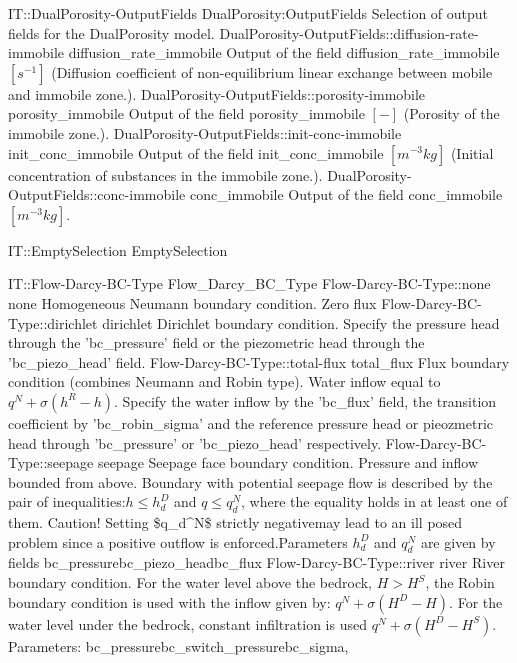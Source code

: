 \begin{SelectionType}
	{IT::DualPorosity-OutputFields}
	{DualPorosity:OutputFields}
	{{{Selection of output fields for the DualPorosity model.}}}
		\SelectionItem
			{DualPorosity-OutputFields::diffusion-rate-immobile}
			{diffusion{\_}rate{\_}immobile}
			{{{Output of the field diffusion{\_}rate{\_}immobile }{$[s^{-1}]$}{ (Diffusion coefficient of non-equilibrium linear exchange between mobile and immobile zone.).}}}
		\SelectionItem
			{DualPorosity-OutputFields::porosity-immobile}
			{porosity{\_}immobile}
			{{{Output of the field porosity{\_}immobile }{$[-]$}{ (Porosity of the immobile zone.).}}}
		\SelectionItem
			{DualPorosity-OutputFields::init-conc-immobile}
			{init{\_}conc{\_}immobile}
			{{{Output of the field init{\_}conc{\_}immobile }{$[m^{-3}kg]$}{ (Initial concentration of substances in the immobile zone.).}}}
		\SelectionItem
			{DualPorosity-OutputFields::conc-immobile}
			{conc{\_}immobile}
			{{{Output of the field conc{\_}immobile }{$[m^{-3}kg]$}{.}}}
\end{SelectionType}
\begin{SelectionType}
	{IT::EmptySelection}
	{EmptySelection}
	{}
\end{SelectionType}
\begin{SelectionType}
	{IT::Flow-Darcy-BC-Type}
	{Flow{\_}Darcy{\_}BC{\_}Type}
	{}
		\SelectionItem
			{Flow-Darcy-BC-Type::none}
			{none}
			{{{Homogeneous Neumann boundary condition. Zero flux}}}
		\SelectionItem
			{Flow-Darcy-BC-Type::dirichlet}
			{dirichlet}
			{{{Dirichlet boundary condition. Specify the pressure head through the 'bc{\_}pressure' field or the piezometric head through the 'bc{\_}piezo{\_}head' field.}}}
		\SelectionItem
			{Flow-Darcy-BC-Type::total-flux}
			{total{\_}flux}
			{{{Flux boundary condition (combines Neumann and Robin type). Water inflow equal to }{$q^N + \sigma (h^R - h)$}{. Specify the water inflow by the 'bc{\_}flux' field, the transition coefficient by 'bc{\_}robin{\_}sigma' and the reference pressure head or pieozmetric head through 'bc{\_}pressure' or 'bc{\_}piezo{\_}head' respectively.}}}
		\SelectionItem
			{Flow-Darcy-BC-Type::seepage}
			{seepage}
			{{{Seepage face boundary condition. Pressure and inflow bounded from above. Boundary with potential seepage flow is described by the pair of inequalities:}{$h \le h_d^D$}{ and }{$ q \le q_d^N$}{, where the equality holds in at least one of them. Caution! Setting {\$}q{\_}d{\^{}}N{\$} strictly negativemay lead to an ill posed problem since a positive outflow is enforced.Parameters }{$h_d^D$}{ and }{$q_d^N$}{ are given by fields }\ttfamily bc{\_}pressure\ttfamily bc{\_}piezo{\_}head\ttfamily bc{\_}flux}}
		\SelectionItem
			{Flow-Darcy-BC-Type::river}
			{river}
			{{{River boundary condition. For the water level above the bedrock, }{$H > H^S$}{, the Robin boundary condition is used with the inflow given by: }{ $q^N + \sigma(H^D - H)$}{. For the water level under the bedrock, constant infiltration is used }{ $q^N + \sigma(H^D - H^S)$}{. Parameters: }\ttfamily bc{\_}pressure\ttfamily bc{\_}switch{\_}pressure\ttfamily bc{\_}sigma,}}
\end{SelectionType}
